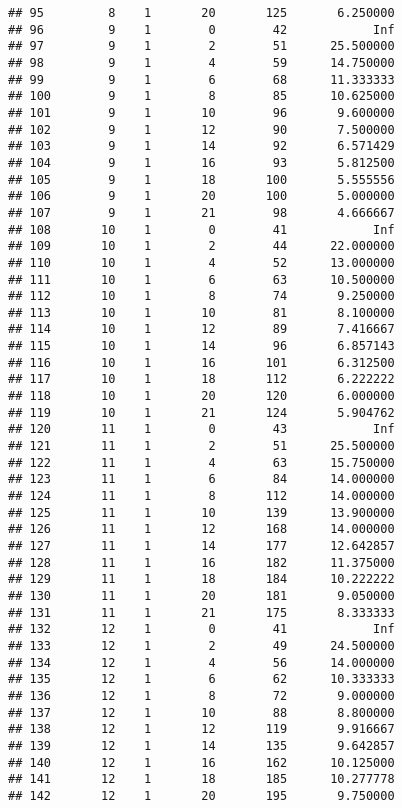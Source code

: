 \documentclass[
]{article}
\begin{document}
\begin{verbatim}
## 95         8    1       20       125       6.250000
## 96         9    1        0        42            Inf
## 97         9    1        2        51      25.500000
## 98         9    1        4        59      14.750000
## 99         9    1        6        68      11.333333
## 100        9    1        8        85      10.625000
## 101        9    1       10        96       9.600000
## 102        9    1       12        90       7.500000
## 103        9    1       14        92       6.571429
## 104        9    1       16        93       5.812500
## 105        9    1       18       100       5.555556
## 106        9    1       20       100       5.000000
## 107        9    1       21        98       4.666667
## 108       10    1        0        41            Inf
## 109       10    1        2        44      22.000000
## 110       10    1        4        52      13.000000
## 111       10    1        6        63      10.500000
## 112       10    1        8        74       9.250000
## 113       10    1       10        81       8.100000
## 114       10    1       12        89       7.416667
## 115       10    1       14        96       6.857143
## 116       10    1       16       101       6.312500
## 117       10    1       18       112       6.222222
## 118       10    1       20       120       6.000000
## 119       10    1       21       124       5.904762
## 120       11    1        0        43            Inf
## 121       11    1        2        51      25.500000
## 122       11    1        4        63      15.750000
## 123       11    1        6        84      14.000000
## 124       11    1        8       112      14.000000
## 125       11    1       10       139      13.900000
## 126       11    1       12       168      14.000000
## 127       11    1       14       177      12.642857
## 128       11    1       16       182      11.375000
## 129       11    1       18       184      10.222222
## 130       11    1       20       181       9.050000
## 131       11    1       21       175       8.333333
## 132       12    1        0        41            Inf
## 133       12    1        2        49      24.500000
## 134       12    1        4        56      14.000000
## 135       12    1        6        62      10.333333
## 136       12    1        8        72       9.000000
## 137       12    1       10        88       8.800000
## 138       12    1       12       119       9.916667
## 139       12    1       14       135       9.642857
## 140       12    1       16       162      10.125000
## 141       12    1       18       185      10.277778
## 142       12    1       20       195       9.750000

\end{verbatim}
\end{document}
